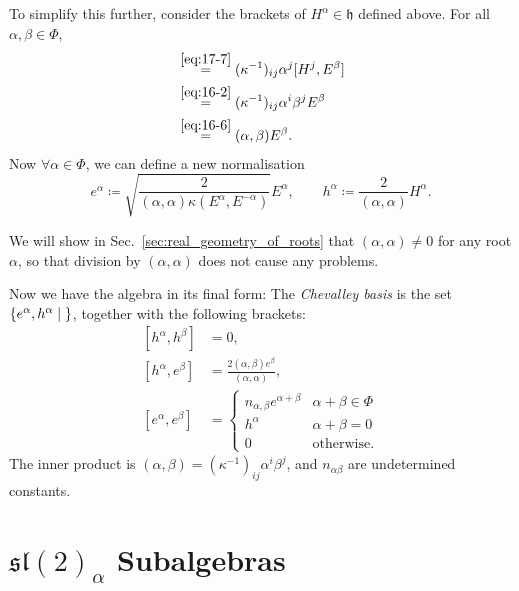 To simplify this further, consider the brackets of $H^{\alpha} \in \mathfrak{h}$ defined above. For all $\alpha, \beta \in \Phi$,
 \begin{align}
   [H^{\alpha}, E^{\beta}] &\stackrel{\eqref{eq:17-7}}{=} (\kappa^{-1})_{ij} \alpha^{j} [H^{j}, E^{\beta}] \\
			   &\stackrel{\eqref{eq:16-2}}{=} (\kappa^{-1})_{ij} \alpha^{i} \beta^{j} E^{\beta} \\
			   &\stackrel{\eqref{eq:16-6}}= (\alpha, \beta) E^{\beta}.
\end{align}
Now $\forall \alpha \in \Phi$, we can define a new normalisation
\begin{equation}
  e^{\alpha} \coloneqq \sqrt{\frac{2}{(\alpha, \alpha)\kappa(E^{\alpha}, E^{-\alpha})}} E^{\alpha}, \qquad 
  h^{\alpha} \coloneqq \frac{2}{(\alpha, \alpha)} H^{\alpha}.
\end{equation}
\begin{remark}
  We will show in Sec.~\ref{sec:real_geometry_of_roots} that $(\alpha, \alpha) \neq 0$ for any root $\alpha$, so that division by $(\alpha, \alpha)$ does not cause any problems.
\end{remark}
Now we have the algebra in its final form: The \emph{Chevalley basis} is the set $\left\{e^\alpha, h^\alpha \suchthat\right\}$, together with the following brackets:
\begin{subequations} \label{eq:17-10}
  \begin{align}
    [h^{\alpha}, h^{\beta}] &= 0, \\
    [h^{\alpha}, e^{\beta}] &= \frac{2 (\alpha, \beta) e^{\beta}}{(\alpha, \alpha)}, \\
    [e^{\alpha}, e^{\beta}] &= 
    \begin{cases}
      n_{\alpha, \beta} e^{\alpha + \beta} & \alpha + \beta \in \Phi \\
      h^{\alpha} & \alpha + \beta = 0 \\
      0 & \text{otherwise}.
    \end{cases}
  \end{align}
\end{subequations}
The inner product is $(\alpha, \beta) = (\kappa^{-1})_{ij} \alpha^{i} \beta^{j}$, and $n_{\alpha\beta}$ are undetermined constants.

\section{\texorpdfstring{$\mathfrak{sl}(2)_{\alpha}$}{sl(2)} Subalgebras}%
\label{sec:sl_2_subalgebras}

